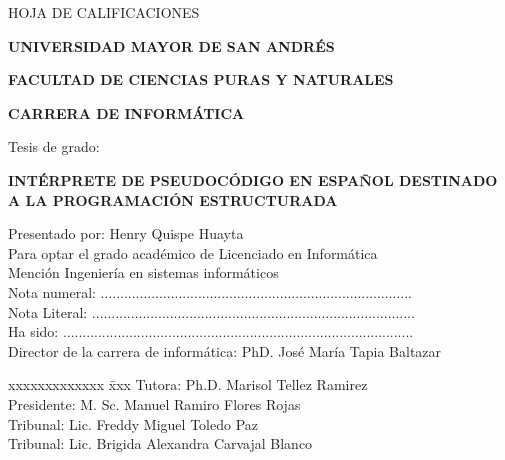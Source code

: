 \begin{center}
  HOJA DE CALIFICACIONES

  \textbf{UNIVERSIDAD MAYOR DE SAN ANDRÉS}

  \textbf{FACULTAD DE CIENCIAS PURAS Y NATURALES}

  \textbf{CARRERA DE INFORMÁTICA}

  Tesis de grado:

  \textbf{INTÉRPRETE DE PSEUDOCÓDIGO EN ESPAÑOL DESTINADO A LA PROGRAMACIÓN ESTRUCTURADA}
\end{center}
Presentado por: Henry Quispe Huayta \\
Para optar el grado académico de Licenciado en Informática \\
Mención Ingeniería en sistemas informáticos \\
Nota numeral:  ................................................................................ \\
Nota Literal:  ................................................................................... \\
Ha sido: .......................................................................................... \\
Director de la carrera de informática: PhD. José María Tapia Baltazar
\begin{tabbing}
  xxxxxxxxxxxxx \= xxx \kill
  Tutora: \> Ph.D. Marisol Tellez Ramirez \\
  Presidente: \> M. Sc. Manuel Ramiro Flores Rojas \\
  Tribunal: \> Lic. Freddy Miguel Toledo Paz \\
  Tribunal: \> Lic. Brigida Alexandra Carvajal Blanco
\end{tabbing}

